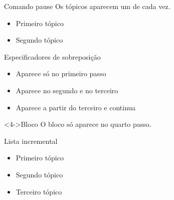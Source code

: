 \documentclass[aspectratio=169]{beamer}
\begin{document}
\begin{frame}{Comando pause}
  Os tópicos aparecem um de cada vez.
  \begin{itemize}
    \pause \item Primeiro tópico
    \pause \item Segundo tópico
  \end{itemize}
\end{frame}

\begin{frame}{Especificadores de sobreposição}
  \begin{itemize}
    \item<1>  Aparece só no primeiro passo
    \item<2-3> Aparece no segundo e no terceiro
    \item<3-> Aparece a partir do terceiro e continua
  \end{itemize}
  \begin{block}<4->{Bloco}
    O bloco só aparece no quarto passo.
  \end{block}
\end{frame}

\begin{frame}{Lista incremental}
  \begin{itemize}[<+->]          %
    \item Primeiro tópico
    \item Segundo tópico
    \item Terceiro tópico
  \end{itemize}
\end{frame}
\end{document}
